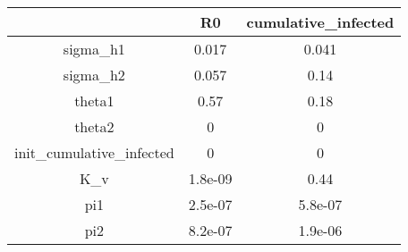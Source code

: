 \begin{tabular}{|c|c|c|}
\hline
& R0 & cumulative_infected \\
\hline
sigma_h1 & 0.017 & 0.041 \\
\hline
sigma_h2 & 0.057 & 0.14 \\
\hline
theta1 & 0.57 & 0.18 \\
\hline
theta2 & 0 & 0 \\
\hline
init_cumulative_infected & 0 & 0 \\
\hline
K_v & 1.8e-09 & 0.44 \\
\hline
pi1 & 2.5e-07 & 5.8e-07 \\
\hline
pi2 & 8.2e-07 & 1.9e-06 \\
\hline
\end{tabular}
